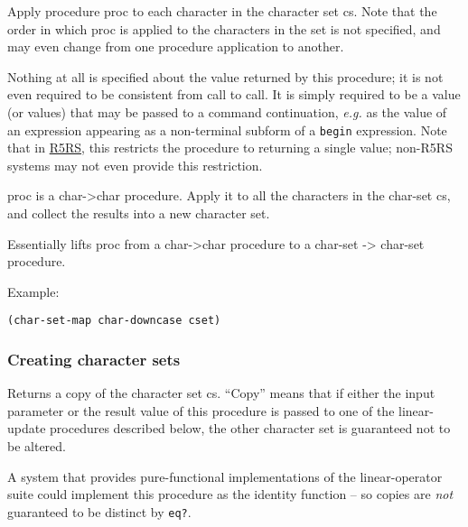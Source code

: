\begin{entry}{%
  }

Apply procedure proc to each character in the character set cs. Note
that the order in which proc is applied to the characters in the set
is not specified, and may even change from one procedure application
to another.

Nothing at all is specified about the value returned by this
procedure; it is not even required to be consistent from call to
call. It is simply required to be a value (or values) that may be
passed to a command continuation, \emph{e.g.} as the value of an
expression appearing as a non-terminal subform of a \texttt{begin}
expression. Note that in \protect\hyperlink{R5RS}{R5RS}, this
restricts the procedure to returning a single value; non-R5RS systems
may not even provide this restriction.
\end{entry}

\begin{entry}{%
  }

  proc is a
  char-\textgreater{}char procedure. Apply it to all the characters in
  the char-set cs, and collect the results into a new character set.

  Essentially lifts proc from a char-\textgreater{}char procedure to a
  char-set -\textgreater{} char-set procedure.

  Example:

\begin{verbatim}
(char-set-map char-downcase cset)
\end{verbatim}
\end{entry}

\subsubsection{{Creating character sets}}\label{creating-character-sets}

\begin{entry}{%
  }

  Returns a copy of
  the character set cs. ``Copy'' means that if either the input
  parameter or the result value of this procedure is passed to one of
  the linear-update procedures described below, the other character
  set is guaranteed not to be altered.

  A system that provides pure-functional implementations of the
  linear-operator suite could implement this procedure as the identity
  function -- so copies are \emph{not} guaranteed to be distinct by
  \texttt{eq?}.
\end{entry}


